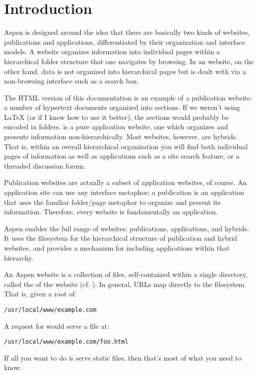 \chapter{Introduction \label{introduction}}

Aspen is designed around the idea that there are basically two kinds of
websites, publications and applications, differentiated by their organization
and interface models. A  website organizes information into
individual pages within a hierarchical folder structure that one navigates by
browsing. In an  website, on the other hand, data is not
organized into hierarchical pages but is dealt with via a non-browsing interface
such as a search box.

The HTML version of this documentation is an example of a publication website: a
number of hypertext documents organized into sections. If we weren't using LaTeX
(or if I knew how to use it better), the sections would probably be encoded in
folders.  is a pure application
website, one which organizes and presents information non-hierarchically. Most
websites, however, are hybrids. That is, within an overall hierarchical
organization you will find both individual pages of information as well as
applications such as a site search feature, or a threaded discussion forum.

Publication websites are actually a subset of application websites, of course.
An application site can use any interface metaphor; a publication is an
application that uses the familiar folder/page metaphor to organize and present
its information. Therefore, every website is fundamentally an application.

Aspen enables the full range of websites: publications, applications, and
hybrids. It uses the filesystem for the hierarchical structure of publication
and hybrid websites, and provides a mechanism for including applications within
that hierarchy.

An Aspen website is a collection of files, self-contained within a single
directory, called the  of the website (cf. ). In
general, URLs map directly to the filesystem. That is, given a root of:

\begin{verbatim}
/usr/local/www/example.com
\end{verbatim}

A request for  would serve a file at:

\begin{verbatim}
/usr/local/www/example.com/foo.html
\end{verbatim}

If all you want to do is serve static files, then that's most of what you need
to know.
